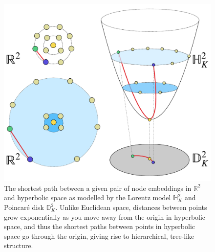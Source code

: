 \begin{figure}
    \centering
    \vspace{-10pt}
    \includegraphics[width=\linewidth]{explanatory_fig.pdf}
    \vspace{-10pt}
    \caption{The shortest path between a given pair of node embeddings in $\mathbb{R}^2$ and hyperbolic space as modelled by the Lorentz model $\mathbb{H}^2_K$ and Poincar\'e disk $\mathbb{D}^2_K$. Unlike Euclidean space, distances between points grow exponentially as you move away from the origin in hyperbolic space, and thus the shortest paths between points in hyperbolic space go through the origin, giving rise to hierarchical, tree-like structure. }
    \vspace{-10pt}
    \label{fig:explanatory_fig_1}
\end{figure}

